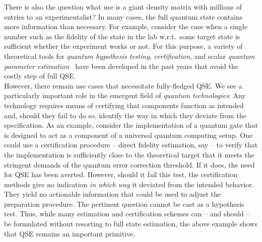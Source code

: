 There is also the question what use is a giant density matrix with millions of entries to an experimentalist?
In many cases, the full quantum state contains more information than necessary.
For example, consider the case when a single number such as the fidelity of the state in the lab w.r.t.\ some target state is sufficient whether the experiment works  or not.
For this purpose, a variety of theoretical tools for \emph{quantum hypothesis testing}, \emph{certification}, and scalar \emph{quantum parameter estimation}~\cite{Donnell_2015_Quantum,Audenaert_2008_Asymptotic,Guehne_2009_Entanglement,Flammia_2011_Direct,Schwemmer_2015_Systematic,Li_2016_Optimal} have been developed in the past years that avoid the costly step of full QSE.\\

However, there remain use cases that necessitate fully-fledged QSE.
We see a particularly important role in the emergent field of \emph{quantum technologies}:
Any technology requires means of certifying that components function as intended and, should they fail to do so, identify the way in which they deviate from the specification.
As an example, consider the implementation of a quantum gate that is designed to act as a component of a universal quantum computing setup.
One could use a certification procedure -- direct fidelity estimation, say -- to verify that the implementation is sufficiently close to the theoretical target that it meets the stringent demands of the quantum error correction threshold.
If it does, the need for QSE has been averted.
However, should it fail this test, the certification methods give no indication \emph{in which way} it deviated from the intended behavior.
They yield no actionable information that could be used to adjust the preparation procedure.
The pertinent question  cannot be cast as a hypothesis test.
Thus, while many estimation and certification schemes can -- and should -- be formulated without resorting to full state estimation, the above example shows that QSE remains an important primitive.

